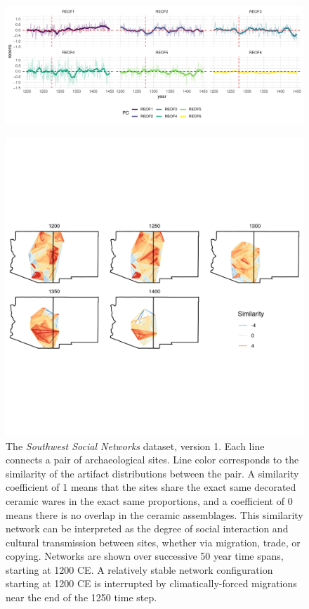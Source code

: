 \documentclass[11pt]{wlscirep}
\begin{document}

\begin{figure}[!ht]
\centering
\includegraphics[width=.8\linewidth]{figures/spei_reconstruction.pdf}
\caption{}
\label{fig:spei-reconstruction}
\end{figure}


\begin{figure}[!ht]
\centering
\includegraphics[width=.8\linewidth]{figures/similarity_network.png}
\caption{The \emph{Southwest Social Networks} dataset, version 1. Each line connects a pair of archaeological sites. Line color corresponds to the similarity of the artifact distributions between the pair. A similarity coefficient of 1 means that the sites share the exact same decorated ceramic wares in the exact same proportions, and a coefficient of 0 means there is no overlap in the ceramic assemblages. This similarity network can be interpreted as the degree of social interaction and cultural transmission between sites, whether via migration, trade, or copying. Networks are shown over successive 50 year time spans, starting at 1200 CE. A relatively stable network configuration starting at 1200 CE is interrupted by climatically-forced migrations near the end of the 1250 time step.}
\label{fig:network-plot}
\end{figure}
\end{document}
